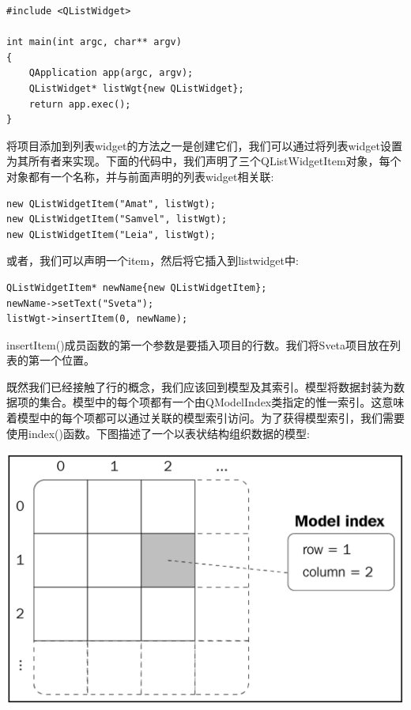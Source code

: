 \begin{lstlisting}[caption={}]
#include <QListWidget>

int main(int argc, char** argv)
{
	QApplication app(argc, argv);
	QListWidget* listWgt{new QListWidget};
	return app.exec();
}
\end{lstlisting}

将项目添加到列表widget的方法之一是创建它们，我们可以通过将列表widget设置为其所有者来实现。下面的代码中，我们声明了三个QListWidgetItem对象，每个对象都有一个名称，并与前面声明的列表widget相关联: \par

\begin{lstlisting}[caption={}]
new QListWidgetItem("Amat", listWgt);
new QListWidgetItem("Samvel", listWgt);
new QListWidgetItem("Leia", listWgt);
\end{lstlisting}

或者，我们可以声明一个item，然后将它插入到listwidget中: \par

\begin{lstlisting}[caption={}]
QListWidgetItem* newName{new QListWidgetItem};
newName->setText("Sveta");
listWgt->insertItem(0, newName);
\end{lstlisting}

insertItem()成员函数的第一个参数是要插入项目的行数。我们将Sveta项目放在列表的第一个位置。 \par
既然我们已经接触了行的概念，我们应该回到模型及其索引。模型将数据封装为数据项的集合。模型中的每个项都有一个由QModelIndex类指定的惟一索引。这意味着模型中的每个项都可以通过关联的模型索引访问。为了获得模型索引，我们需要使用index()函数。下图描述了一个以表状结构组织数据的模型: \par

\begin{center}
	\includegraphics[width=1.0\textwidth]{content/Section-2/Chapter-14/10}
\end{center}

